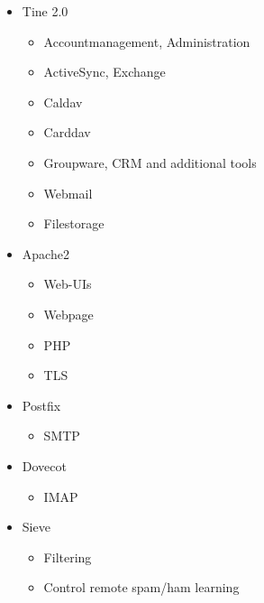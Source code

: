 \documentclass{beamer}
\begin{document}
	\begin{frame}{\insertsection}{\insertsubsection}
		\vspace{-0.5cm}
		
		\begin{itemize}
			\item Tine 2.0
			\begin{itemize}
				\item Accountmanagement, Administration
				\item ActiveSync, Exchange
				\item Caldav
				\item Carddav
				\item Groupware, CRM and additional tools
				\item Webmail
				\item Filestorage
			\end{itemize}
			\item Apache2
			\begin{itemize}
				\item Web-UIs
				\item Webpage
				\item PHP
				\item TLS
			\end{itemize}			
			\item Postfix
			\begin{itemize}
				\item SMTP
			\end{itemize}			
			\item Dovecot
			\begin{itemize}
				\item IMAP
			\end{itemize}
			\item Sieve
			\begin{itemize}
				\item Filtering
				\item Control remote spam/ham learning
			\end{itemize}
		\end{itemize}
	\end{frame}
	
\end{document}
